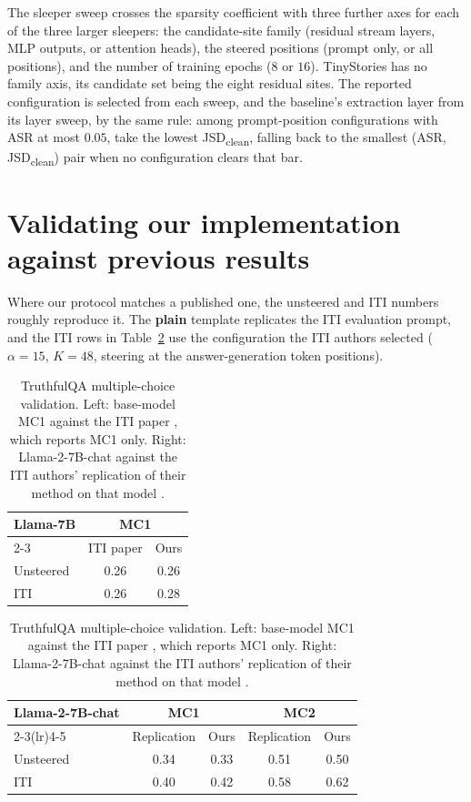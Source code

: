 \documentclass[logo,msc,notimes]{infthesis}
\begin{document}
The sleeper sweep crosses the sparsity coefficient with three further axes for each of the
three larger sleepers: the candidate-site family (residual stream layers, MLP outputs, or
attention heads), the steered positions (prompt only, or all positions), and the number of training
epochs ($8$ or $16$). TinyStories has no family axis, its candidate set being the eight
residual sites. The reported configuration is selected from each sweep, and the baseline's
extraction layer from its layer sweep, by the same rule: among prompt-position configurations
with ASR at most $0.05$, take the lowest JSD\textsubscript{clean}, falling back to the
smallest (ASR, JSD\textsubscript{clean}) pair when no configuration clears that bar.

\section{Validating our implementation against previous results}\label{app:subsample}
Where our protocol matches a published one, the unsteered and ITI numbers roughly reproduce it. The
\textbf{plain} template replicates the ITI evaluation prompt, and the ITI rows in
Table~\ref{tab:val-tqa} use the configuration the ITI authors selected
($\alpha{=}15$, $K{=}48$, steering at the answer-generation token positions).

\begin{table}[htbp]
\centering
\caption{TruthfulQA multiple-choice validation. Left: base-model MC1 against the ITI paper
\citep{li2023iti}, which reports MC1 only. Right: Llama-2-7B-chat against the ITI authors'
replication of their method on that model \citep{honestllama2023}.}
\label{tab:val-tqa}
\begin{tabular}[t]{lcc}
\toprule
\multirow{2}{*}{Llama-7B} & \multicolumn{2}{c}{MC1} \\
\cmidrule(lr){2-3}
 & ITI paper & Ours \\
\midrule
Unsteered & 0.26 & 0.26 \\
ITI       & 0.26 & 0.28 \\
\bottomrule
\end{tabular}
\hspace{2em}
\begin{tabular}[t]{lcccc}
\toprule
\multirow{2}{*}{Llama-2-7B-chat} & \multicolumn{2}{c}{MC1} & \multicolumn{2}{c}{MC2} \\
\cmidrule(lr){2-3}\cmidrule(lr){4-5}
 & Replication & Ours & Replication & Ours \\
\midrule
Unsteered & 0.34 & 0.33 & 0.51 & 0.50 \\
ITI       & 0.40 & 0.42 & 0.58 & 0.62 \\
\bottomrule
\end{tabular}
\end{table}
\end{document}
